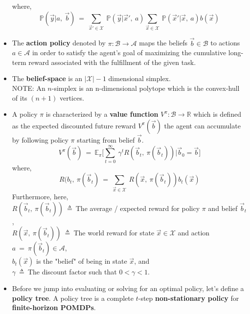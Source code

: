 \documentclass[12pt, draftcls, onecolumn]{IEEEtran}
\begin{document}
\begin{itemize}
\begin{equation}
    \end{equation}
    where,
    \begin{equation}\label{95}
        \mathbb{P}(\vec{y}|a,\ \vec{b})\ =\ \sum_{\vec{x}' \in \mathcal{X}}\ \mathbb{P}(\vec{y}|\vec{x}',\ a)\sum_{\vec{x} \in \mathcal{X}}\ \mathbb{P}(\vec{x}'|\vec{x},\ a)b(\vec{x})
    \end{equation}
    \item The \textbf{action policy} denoted by $\pi: \mathcal{B} \rightarrow \mathcal{A}$ maps the beliefs $\vec{b} \in \mathcal{B}$ to actions $a \in \mathcal{A}$ in order to satisfy the agent's goal of maximizing the cumulative long-term reward associated with the fulfillment of the given task.
    \item The \textbf{belief-space} is an $|\mathcal{X}|-1$ dimensional simplex.
    \\NOTE: An $n$-simplex is an n-dimensional polytope which is the convex-hull of its $(n+1)$ vertices.
    \item A policy $\pi$ is characterized by a \textbf{value function} $V^{\pi}: \mathcal{B} \rightarrow \mathbb{R}$ which is defined as the expected discounted future reward $V^{\pi}(\vec{b})$ the agent can accumulate by following policy $\pi$ starting from belief $\vec{b}$.
    \begin{equation}\label{96}
        V^{\pi}(\vec{b})\ =\ \mathbb{E}_{\pi}\Big[\sum_{t=0}^{\infty}\ \gamma^t R(\vec{b}_t,\ \pi(\vec{b}_t))|\vec{b}_0=\vec{b}\Big]
    \end{equation}
    where,
    \begin{equation}\label{97}
       R(b_t,\ \pi(\vec{b}_t)\ =\ \sum_{\vec{x} \in \mathcal{X}}\ R(\vec{x},\ \pi(\vec{b}_t))b_t(\vec{x})
    \end{equation}
    Furthermore, here,
    \\$R(\vec{b}_t,\ \pi(\vec{b}_t))\ \triangleq\ $The average / expected reward for policy $\pi$ and belief $\vec{b}_t$,
    \\$R(\vec{x},\ \pi(\vec{b}_t))\ \triangleq\ $The world reward for state $\vec{x} \in \mathcal{X}$ and action $a\ =\ \pi(\vec{b}_t) \in \mathcal{A}$,
    \\$b_t(\vec{x})$ is the "belief" of being in state $\vec{x}$, and
    \\$\gamma\ \triangleq\ $The discount factor such that $0 < \gamma < 1$.
    \item Before we jump into evaluating or solving for an optimal policy, let's define a \textbf{policy tree}. A policy tree is a complete $t$-step \textbf{non-stationary policy} for \textbf{finite-horizon POMDPs}.

\end{itemize}
\end{document}
